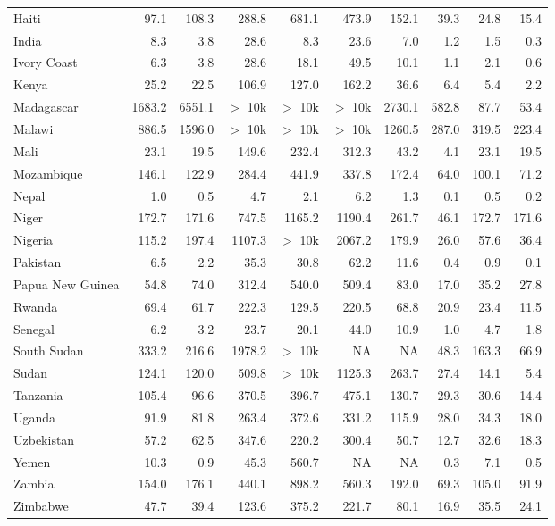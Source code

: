 \documentclass[12pt,english]{article}
\begin{document}
\begin{table}[b]
{\begin{tabular}[t]{lrrrrrrrrr}
          Haiti & 97.1 & 108.3 & 288.8 & 681.1 & 473.9 & 152.1 & 39.3 & 24.8 & 15.4\\
          India & 8.3 & 3.8 & 28.6 & 8.3 & 23.6 & 7.0 & 1.2 & 1.5 & 0.3\\
          Ivory Coast & 6.3 & 3.8 & 28.6 & 18.1 & 49.5 & 10.1 & 1.1 & 2.1 & 0.6\\
          Kenya & 25.2 & 22.5 & 106.9 & 127.0 & 162.2 & 36.6 & 6.4 & 5.4 & 2.2\\
          Madagascar & 1683.2 & 6551.1 & $>$ 10k & $>$ 10k & $>$ 10k & 2730.1 & 582.8 & 87.7 & 53.4\\
          Malawi & 886.5 & 1596.0 & $>$ 10k & $>$ 10k & $>$ 10k & 1260.5 & 287.0 & 319.5 & 223.4\\
          Mali & 23.1 & 19.5 & 149.6 & 232.4 & 312.3 & 43.2 & 4.1 & 23.1 & 19.5\\
          Mozambique & 146.1 & 122.9 & 284.4 & 441.9 & 337.8 & 172.4 & 64.0 & 100.1 & 71.2\\
          Nepal & 1.0 & 0.5 & 4.7 & 2.1 & 6.2 & 1.3 & 0.1 & 0.5 & 0.2\\
          Niger & 172.7 & 171.6 & 747.5 & 1165.2 & 1190.4 & 261.7 & 46.1 & 172.7 & 171.6\\
          Nigeria & 115.2 & 197.4 & 1107.3 & $>$ 10k & 2067.2 & 179.9 & 26.0 & 57.6 & 36.4\\
          Pakistan & 6.5 & 2.2 & 35.3 & 30.8 & 62.2 & 11.6 & 0.4 & 0.9 & 0.1\\
          Papua New Guinea & 54.8 & 74.0 & 312.4 & 540.0 & 509.4 & 83.0 & 17.0 & 35.2 & 27.8\\
          Rwanda & 69.4 & 61.7 & 222.3 & 129.5 & 220.5 & 68.8 & 20.9 & 23.4 & 11.5\\
          Senegal & 6.2 & 3.2 & 23.7 & 20.1 & 44.0 & 10.9 & 1.0 & 4.7 & 1.8\\
          South Sudan & 333.2 & 216.6 & 1978.2 & $>$ 10k & NA & NA & 48.3 & 163.3 & 66.9\\
          Sudan & 124.1 & 120.0 & 509.8 & $>$ 10k & 1125.3 & 263.7 & 27.4 & 14.1 & 5.4\\
          Tanzania & 105.4 & 96.6 & 370.5 & 396.7 & 475.1 & 130.7 & 29.3 & 30.6 & 14.4\\
          Uganda & 91.9 & 81.8 & 263.4 & 372.6 & 331.2 & 115.9 & 28.0 & 34.3 & 18.0\\
          Uzbekistan & 57.2 & 62.5 & 347.6 & 220.2 & 300.4 & 50.7 & 12.7 & 32.6 & 18.3\\
          Yemen & 10.3 & 0.9 & 45.3 & 560.7 & NA & NA & 0.3 & 7.1 & 0.5\\
          Zambia & 154.0 & 176.1 & 440.1 & 898.2 & 560.3 & 192.0 & 69.3 & 105.0 & 91.9\\
          Zimbabwe & 47.7 & 39.4 & 123.6 & 375.2 & 221.7 & 80.1 & 16.9 & 35.5 & 24.1\\
          \bottomrule
          \end{tabular}}
          \end{table}
\end{document}
